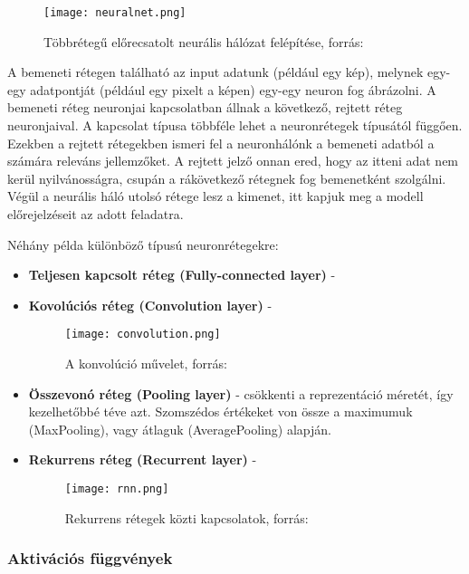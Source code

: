 \begin{figure}[H]
  \centering
  \texttt{[image: neuralnet.png]}
  \caption{Többrétegű előrecsatolt neurális hálózat felépítése, forrás: \cite{deeplearningbook}}
\end{figure}

A bemeneti rétegen található az input adatunk (például egy kép), melynek egy-egy adatpontját (például egy pixelt a képen) egy-egy neuron fog ábrázolni. A bemeneti réteg neuronjai kapcsolatban állnak a következő, rejtett réteg neuronjaival. A kapcsolat típusa többféle lehet a neuronrétegek típusától függően. Ezekben a rejtett rétegekben ismeri fel a neuronhálónk a bemeneti adatból a számára releváns jellemzőket. A rejtett jelző onnan ered, hogy az itteni adat nem kerül nyilvánosságra, csupán a rákövetkező rétegnek fog bemenetként szolgálni. Végül a neurális háló utolsó rétege lesz a kimenet, itt kapjuk meg a modell előrejelzéseit az adott feladatra. \cite{deeplearningbook} 

Néhány példa különböző típusú neuronrétegekre:
\begin{itemize}
 \item \textbf{Teljesen kapcsolt réteg (Fully-connected layer)} - 
 
 \item \textbf{Kovolúciós réteg (Convolution layer)} -
 
 
\begin{figure}[H]
  \centering
  \texttt{[image: convolution.png]}
  \caption{A konvolúció művelet, forrás: \cite{deeplearningbook}}
\end{figure}
 
 \item \textbf{Összevonó réteg (Pooling layer)} - csökkenti a reprezentáció méretét, így kezelhetőbbé téve azt. Szomszédos értékeket von össze a maximumuk (MaxPooling), vagy átlaguk (AveragePooling) alapján.
 \item \textbf{Rekurrens réteg (Recurrent layer)} -  \cite{deeplearningbook}
 
\begin{figure}[H]
  \centering
  \texttt{[image: rnn.png]}
  \caption{Rekurrens rétegek közti kapcsolatok, forrás: \cite{deeplearningbook}}
\end{figure}

\end{itemize}

\subsubsection{Aktivációs függvények}

